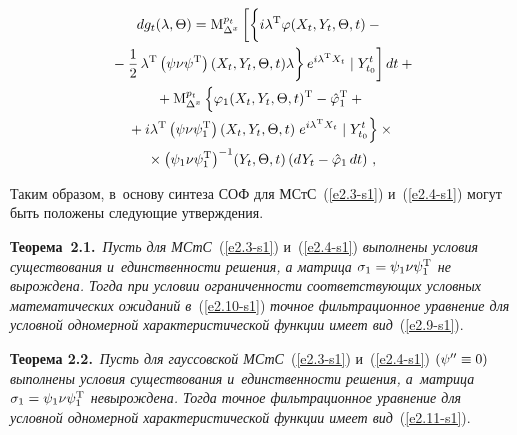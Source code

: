 \begin{multicols}{2}
\noindent
\begin{multline}
dg_t (\la,\Theta) = {\mm}_{\Delta^x}^{p_t} \left[\left\{
\vphantom{\fr{1}{2}}
 i\la^{\mathrm{T}} 
\varphi (X_t,Y_t,\Theta, t) -{}\right.\right.\\
\left.\left.{}- \fr{1}{2}\, \la^{\mathrm{T}} 
\left(\psi\nu\psi^{\mathrm{T}}\right) (X_t,Y_t,\Theta, t) \la\right\} 
e^{i\la^{\mathrm{T}} X_t} \mid Y_{t_0}^t\right] dt+{}\\
{}+ {\mm}_{\Delta^x}^{p_t} %
\left\{ 
\vphantom{\left(\psi_1\nu\psi_1^{\mathrm{T}}\right)^{-1}}
\varphi_1 (X_t,Y_t,\Theta, t)^{\mathrm{T}} -\hat\varphi_1^{\mathrm{T}} +{}%
\right.\\
{}+
    i\la^{\mathrm{T}} \left(\psi\nu\psi_1^{\mathrm{T}}\right) (X_t,Y_t, \Theta,t) 
\left. e^{i\la^{\mathrm{T}} X_t} \mid Y_{t_0}^t \right\}\times{}\\
{}\times 
\left(\psi_1\nu\psi_1^{\mathrm{T}}\right)^{-1} \!(Y_t,\Theta,t) 
\left(dY_t-\hat\varphi_1
    \,dt\right) %
    \,,
    \label{e2.11-s1}
    \end{multline}

Таким образом, в~основу синтеза СОФ для МСтС~(\ref{e2.3-s1}) и~(\ref{e2.4-s1})
могут быть положены  следующие утверждения.

\vspace*{3pt}

\noindent
\textbf{Теорема~2.1.}\
\textit{Пусть для МСтС}~(\ref{e2.3-s1}) и~(\ref{e2.4-s1})
\textit{выполнены условия существования и~единственности решения, а матрица 
$\si_1 \hm=\psi_1\nu\psi_1^{\mathrm{T}}$ не вырождена. 
Тогда при условии ограниченности соответствующих условных математических 
ожиданий в}~(\ref{e2.10-s1}) \textit{точное фильтрационное уравнение для условной 
одномерной характеристической функции имеет вид}~(\ref{e2.9-s1}).

\smallskip

\noindent
\textbf{Теорема 2.2.}\ 
\textit{Пусть для гауссовской МСтС}~(\ref{e2.3-s1})  и~(\ref{e2.4-s1})
$(\psi''\hm\equiv 0)$ \textit{выполнены условия существования и~единственности решения, 
а~матрица $\si_1 \hm=\psi_1\nu\psi_1^{\mathrm{T}}$ не\linebreak вырождена. 
Тогда точное
фильт\-ра\-ционное уравнение для условной одномерной характеристической 
функции имеет вид}~(\ref{e2.11-s1}).

\vspace*{3pt}


\end{multicols}
